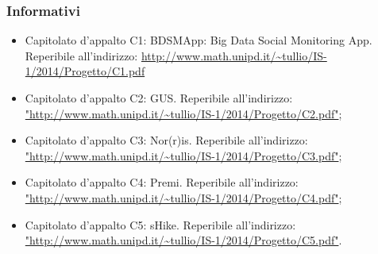 	\subsubsection{Informativi}
		\begin{itemize}
			\item Capitolato d’appalto C1: BDSMApp: Big Data Social Monitoring App. Reperibile all'indirizzo:  \url{http://www.math.unipd.it/~tullio/IS-1/2014/Progetto/C1.pdf}
			\item Capitolato d’appalto C2: GUS. Reperibile all'indirizzo: \url{"http://www.math.unipd.it/~tullio/IS-1/2014/Progetto/C2.pdf"};
			\item Capitolato d’appalto C3: Nor(r)is. Reperibile all'indirizzo: \url{"http://www.math.unipd.it/~tullio/IS-1/2014/Progetto/C3.pdf"};
			\item Capitolato d’appalto C4: Premi. Reperibile all'indirizzo: \url{"http://www.math.unipd.it/~tullio/IS-1/2014/Progetto/C4.pdf"};
			\item Capitolato d’appalto C5: sHike. Reperibile all'indirizzo: \url{"http://www.math.unipd.it/~tullio/IS-1/2014/Progetto/C5.pdf"}.
		\end{itemize}